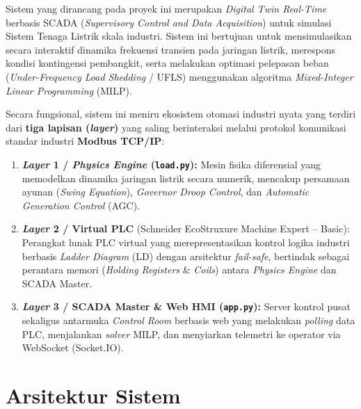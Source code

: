 
Sistem yang dirancang pada proyek ini merupakan \textit{Digital Twin Real-Time} berbasis SCADA (\textit{Supervisory Control and Data Acquisition}) untuk simulasi Sistem Tenaga Listrik skala industri.
Sistem ini bertujuan untuk mensimulasikan secara interaktif dinamika frekuensi transien pada jaringan listrik, merespons kondisi kontingensi pembangkit, serta melakukan optimasi pelepasan beban (\textit{Under-Frequency Load Shedding} / UFLS) menggunakan algoritma \textit{Mixed-Integer Linear Programming} (MILP).

Secara fungsional, sistem ini meniru ekosistem otomasi industri nyata yang terdiri dari \textbf{tiga lapisan (\textit{layer})} yang saling berinteraksi melalui protokol komunikasi standar industri \textbf{Modbus TCP/IP}:

\begin{enumerate}
    \item[a.] \textbf{\textit{Layer} 1 / \textit{Physics Engine} (\texttt{load.py}):}
    Mesin fisika diferensial yang memodelkan dinamika jaringan listrik secara numerik, mencakup persamaan ayunan (\textit{Swing Equation}), \textit{Governor Droop Control}, dan \textit{Automatic Generation Control} (AGC).

    \item[b.] \textbf{\textit{Layer} 2 / Virtual PLC} (Schneider EcoStruxure Machine Expert -- Basic):
    Perangkat lunak PLC virtual yang merepresentasikan kontrol logika industri berbasis \textit{Ladder Diagram} (LD) dengan arsitektur \textit{fail-safe}, bertindak sebagai perantara memori (\textit{Holding Registers} \& \textit{Coils}) antara \textit{Physics Engine} dan SCADA Master.

    \item[c.] \textbf{\textit{Layer} 3 / SCADA Master \& Web HMI (\texttt{app.py}):}
    Server kontrol pusat sekaligus antarmuka \textit{Control Room} berbasis web yang melakukan \textit{polling} data PLC, menjalankan \textit{solver} MILP, dan menyiarkan telemetri ke operator via WebSocket (Socket.IO).
\end{enumerate}

\section{Arsitektur Sistem}
\label{sec:Arsitektur_Sistem}


